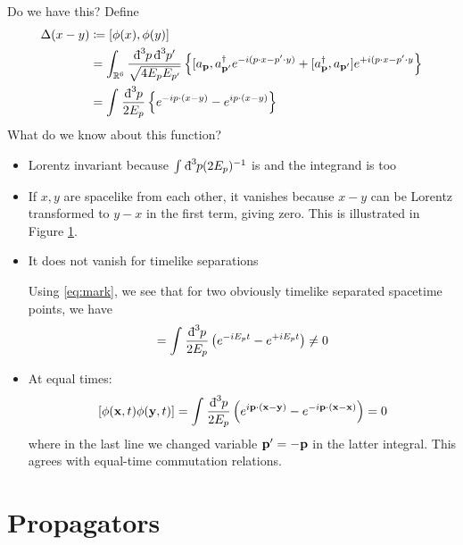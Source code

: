 Do we have this? Define
\begin{align}
  \Delta(x - y) &\coloneqq [\phi(x), \phi(y)] \\
		&= \int_{\mathbb{R}^6}^{} \frac{\bdd[3]{p} \bdd[3]{p'}}{\sqrt{4 E_p E_{p'}}} \left\{ [a_{\vb{p}}, a^{\dagger}_{\vb{p}'} e^{-i (p \cdot x - p' \cdot y)} + [a^{\dagger}_{\vb{p}}, a_{\vb{p}'} ] e^{+i (p \cdot x - p' \cdot y} \right\} \\
		&= \int_{}^{} \frac{\bdd[3]{p}}{2E_p} \left\{ e^{-i p \cdot (x - y)} - e^{i p \cdot (x - y)} \right\} \label{eq:mark}
\end{align}
What do we know about this function?
\begin{itemize}
  \item Lorentz invariant because $\int_{}^{} \bdd[3]{p} (2 E_p)^{-1}$ is and the integrand is too
  \item If $x, y$ are spacelike from each other, it vanishes because $x - y$ can be Lorentz transformed to $y - x$ in the first term, giving zero. This is illustrated in Figure \ref{fig:l6f1}.
    \begin{figure}[tbhp]
      \centering
      \def\svgwidth{0.4\columnwidth}
      
      \caption{}
      \label{fig:l6f1}
    \end{figure}
  \item It does not vanish for timelike separations
    \begin{example}[]
      Using \eqref{eq:mark}, we see that for two obviously timelike separated spacetime points, we have
      \begin{equation}
	[\phi (\vb{x}, 0), \phi(\vb{x} , t) ] = \int_{}^{} \frac{\bdd[3]{p} }{2E_p} \left( e^{-i E_p t} - e^{+i E_p t} \right) \neq 0
      \end{equation}
    \end{example}
  \item At equal times:
    \begin{equation}
      \label{eq:mark2}
      [\phi(\vb{x}, t) \phi(\vb{y}, t) ] = \int_{}^{} \frac{\bdd[3]{p}}{2E_p} \left( e^{i \vb{p} \cdot (\vb{x} - \vb{y})} - e^{-i \vb{p} \cdot (\vb{x} - \vb{x})}\right) = 0
    \end{equation}
    where in the last line we changed variable $\vb{p}' = -\vb{p}$ in the latter integral.
    This agrees with equal-time commutation relations.
\end{itemize}

\section{Propagators}%
\label{sec:propagators}

